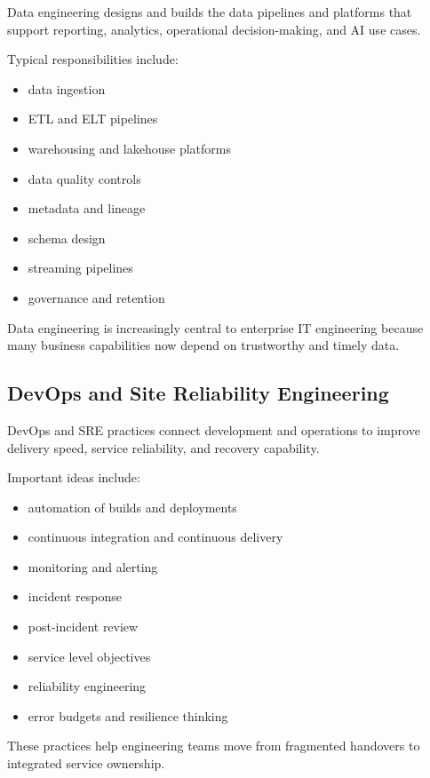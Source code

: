 \documentclass[
  british,
  letterpaper,
  DIV=11,
  numbers=noendperiod]{scrartcl}
\providecommand{\tightlist}{%
  \setlength{\itemsep}{0pt}\setlength{\parskip}{0pt}}
\begin{document}
Data engineering designs and builds the data pipelines and platforms
that support reporting, analytics, operational decision-making, and AI
use cases.

Typical responsibilities include:

\begin{itemize}
\tightlist
\item
  data ingestion
\item
  ETL and ELT pipelines
\item
  warehousing and lakehouse platforms
\item
  data quality controls
\item
  metadata and lineage
\item
  schema design
\item
  streaming pipelines
\item
  governance and retention
\end{itemize}

Data engineering is increasingly central to enterprise IT engineering
because many business capabilities now depend on trustworthy and timely
data.

\subsection{DevOps and Site Reliability
Engineering}\label{devops-and-site-reliability-engineering}

DevOps and SRE practices connect development and operations to improve
delivery speed, service reliability, and recovery capability.

Important ideas include:

\begin{itemize}
\tightlist
\item
  automation of builds and deployments
\item
  continuous integration and continuous delivery
\item
  monitoring and alerting
\item
  incident response
\item
  post-incident review
\item
  service level objectives
\item
  reliability engineering
\item
  error budgets and resilience thinking
\end{itemize}

These practices help engineering teams move from fragmented handovers to
integrated service ownership.
\end{document}
